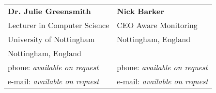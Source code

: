 \documentclass[margin,line]{resume}
\begin{document}
\begin{resume}
\begin{tabular}{@{}p{6cm}p{6cm}}
\textbf{Dr. Julie Greensmith}       &  \textbf{Nick Barker}                   \\
Lecturer in Computer Science			  &  CEO Aware Monitoring                       \\
University of Nottingham                &  Nottingham, England                      \\
Nottingham, England                     &          \\
phone: \textsl{available on request}    &  phone: \textsl{available on request}     \\
e-mail: \textsl{available on request}   &  e-mail: \textsl{available on request}    \\
\end{tabular}



\end{resume}
\end{document}
